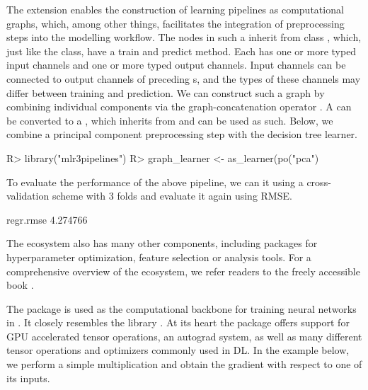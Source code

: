 \documentclass[article]{jss}
\theoremstyle{definition}
\begin{document}
The  extension enables the construction of learning pipelines as computational graphs, which, among other things, facilitates the integration of preprocessing steps into the modelling workflow.
The nodes in such a  inherit from class , which, just like the  class, have a train and predict method.
Each  has one or more typed input channels and one or more typed output channels. Input channels can be connected to output channels of preceding s, and the types of these channels may differ between training and prediction.
We can construct such a graph by combining individual components via the graph-concatenation operator \code{\%>>\%}.
A  can be converted to a , which inherits from  and can be used as such.
Below, we combine a principal component preprocessing step with the decision tree learner.

\begin{CodeInput}
R> library("mlr3pipelines")
R> graph_learner <- as_learner(po("pca") %
\end{CodeInput}

To evaluate the performance of the above pipeline, we can  it using a cross-validation  scheme with 3 folds and evaluate it again using RMSE.

\begin{CodeOutput}
regr.rmse
 4.274766
\end{CodeOutput}

The  ecosystem also has many other components, including packages for hyperparameter optimization, feature selection or analysis tools.
For a comprehensive overview of the  ecosystem, we refer readers to the freely accessible book \citep{ref-mlr3book}.

The  package is used as the computational backbone for training neural networks in .
It closely resembles the \pytorch{} \python{} library \citep{ref-pytorch}.
At its heart the package offers support for GPU accelerated tensor operations, an autograd system, as well as many different tensor operations and optimizers commonly used in DL.
In the example below, we perform a simple multiplication and obtain the gradient with respect to one of its inputs.
\end{document}
